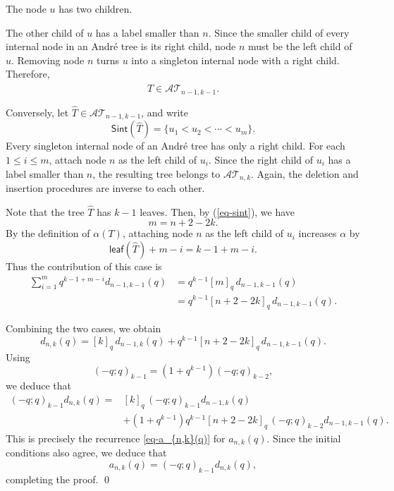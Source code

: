 \documentclass[12pt]{article}
\numberwithin{equation}{section}
\theoremstyle{plain}
\def\Sint{\mathsf{Sint}}
\def\leaf{\mathsf{leaf}}
\begin{document}
	 				 		 The node $u$ has two children.
	 				 		
	 				 		The other child of $u$ has a label smaller than $n$. Since the
	 				 		smaller child of every internal node in an Andr\'e tree is its
	 				 		right child, node $n$ must be the left child of $u$. Removing
	 				 		node $n$ turns $u$ into a singleton internal node with a right
	 				 		child. Therefore,
	 				 		\[
	 				 		\widehat{T}\in\mathcal{AT}_{n-1,k-1}.
	 				 		\]
	 				 		
	 				 		Conversely, let $\widehat{T}\in\mathcal{AT}_{n-1,k-1}$, and write
	 				 		\[
	 				 		\Sint(\widehat{T})
	 				 		=\{u_1<u_2<\cdots<u_m\}.
	 				 		\]
	 				 		Every singleton internal node of an Andr\'e tree has only a right
	 				 		child. For each $1\leq i\leq m$, attach node $n$ as the left child
	 				 		of $u_i$. Since the right child of $u_i$ has a label smaller than
	 				 		$n$, the resulting tree belongs to $\mathcal{AT}_{n,k}$. Again,
	 				 		the deletion and insertion procedures are inverse to each other.
	 				 		
	 				 		Note that the tree $\widehat{T}$ has $k-1$ leaves.  Then, by (\ref{eq-sint}), we have 
	 				 		\[
	 				 		m=n+2-2k.
	 				 		\]
	 				 		By the definition of $\alpha(T)$, attaching node $n$ as the left
	 				 		child of $u_i$ increases $\alpha$ by
	 				 		\[
	 				 		\leaf(\widehat{T})+m-i=k-1+m-i.
	 				 		\]
	 				 		Thus the contribution of this case is
	 				 		\[
	 				 		\begin{aligned}
	 				 			\sum_{i=1}^{m}q^{k-1+m-i}d_{n-1,k-1}(q)
	 				 			&=q^{k-1}[m]_q\,d_{n-1,k-1}(q)\\
	 				 			&=q^{k-1}[n+2-2k]_q\,d_{n-1,k-1}(q).
	 				 		\end{aligned}
	 				 		\]
	 				 		
	 				 		Combining the two cases, we obtain
	 				 		\[
	 				 		d_{n,k}(q)
	 				 		=[k]_q\,d_{n-1,k}(q)
	 				 		+q^{k-1}[n+2-2k]_q\,d_{n-1,k-1}(q).
	 				 		\]
	 				 		Using
	 				 		\[
	 				 		(-q;q)_{k-1}
	 				 		=(1+q^{k-1})(-q;q)_{k-2},
	 				 		\]
	 				 		we deduce that
	 				 		\[
	 				 		\begin{aligned}
	 				 			(-q;q)_{k-1}d_{n,k}(q)
	 				 			={}&[k]_q\,(-q;q)_{k-1}d_{n-1,k}(q)\\
	 				 			&+(1+q^{k-1})q^{k-1}[n+2-2k]_q\,
	 				 			(-q;q)_{k-2}d_{n-1,k-1}(q).
	 				 		\end{aligned}
	 				 		\]
	 				 		This is precisely the recurrence \eqref{eq-a_{n,k}(q)} for
	 				 		$a_{n,k}(q)$. Since the initial   conditions also
	 				 		agree,  we deduce that
	 				 		\[
	 				 		a_{n,k}(q)=(-q;q)_{k-1}d_{n,k}(q),
	 				 		\]
	 				 		completing the proof. \qed
	 				  
\end{document}
